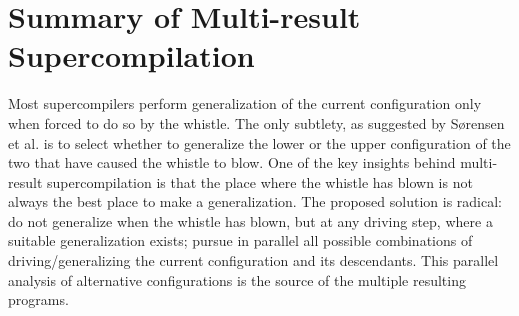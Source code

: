 \documentclass[submission,copyright,creativecommons]{eptcs}
\begin{document}
\section{Summary of Multi-result Supercompilation}\label{sec:MRSCSummary}

Most supercompilers perform generalization of the current configuration only
when forced to do so by the whistle.
The only subtlety, as suggested by S{\o}rensen et al. \cite{sorm98b} is to select
whether to generalize the lower or the upper configuration of the two that
have caused the whistle to blow.
One of the key insights behind multi-result supercompilation is that the place
where the whistle has blown is not always the best place to make a generalization.
The proposed solution is radical: do not generalize when the whistle has blown,
but at any driving step, where a suitable generalization exists;
pursue in parallel all possible combinations of driving/generalizing 
the current configuration and its descendants.
This parallel analysis of alternative configurations is the source
of the multiple resulting programs.
\end{document}

